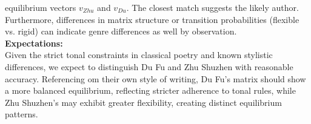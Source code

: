 \documentclass[12pt]{article}
\begin{document}
equilibrium vectors $v_{Zhu}$ and $v_{Du}$. The closest match suggests the likely author.
Furthermore, differences in matrix structure or transition probabilities (flexible vs. rigid) can indicate genre differences as well by observation.
\\
\textbf{Expectations: }
\\
Given the strict tonal constraints in classical poetry and known stylistic differences, we expect to distinguish Du Fu and Zhu Shuzhen with reasonable accuracy. 
Referencing om their own style of writing, Du Fu's matrix should show a more balanced equilibrium, reflecting stricter adherence to tonal rules,
while Zhu Shuzhen's may exhibit greater flexibility, creating distinct equilibrium patterns.
\end{document}
